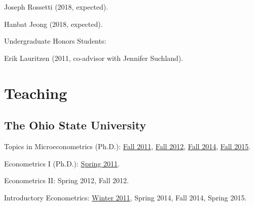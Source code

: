 \documentclass[10pt,letterpaper]{article}
\renewenvironment{itemize}{
  \begin{list}{}{
    \setlength{\leftmargin}{1.5em}
    \setlength{\itemsep}{0.25em}
    \setlength{\parskip}{0pt}
    \setlength{\parsep}{0.25em}
  }
}{
  \end{list}
}
\begin{document}
\begin{itemize}
\begin{itemize}
  \item Joseph Rossetti (2018, expected).
  \item Hanbat Jeong (2018, expected).
  \end{itemize}
\item Undergraduate Honors Students:
  \begin{itemize}
  \item Erik Lauritzen (2011, co-advisor with Jennifer Suchland).
  \end{itemize}
\end{itemize}

\section*{Teaching}

\subsection*{The Ohio State University}

\begin{itemize}
\item Topics in Microeconometrics (Ph.D.):
  \href{http://jblevins.org/courses/econ843f11/}{Fall 2011}, %
  \href{http://jblevins.org/courses/econ8833f12/}{Fall 2012}, %
  \href{http://jblevins.org/courses/econ8833f14/}{Fall 2014}, %
  \href{http://jblevins.org/courses/econ8833f15/}{Fall 2015}. %
\item Econometrics I (Ph.D.):
  \href{http://jblevins.org/courses/econ741s11/}{Spring 2011}. %
\item Econometrics II:
  Spring 2012, %
  Fall 2012. %
\item Introductory Econometrics:
  \href{http://jblevins.org/courses/econ444w11/}{Winter 2011}, %
  Spring 2014, %
  Fall 2014, %
  Spring 2015. %
\end{itemize}
\end{document}
